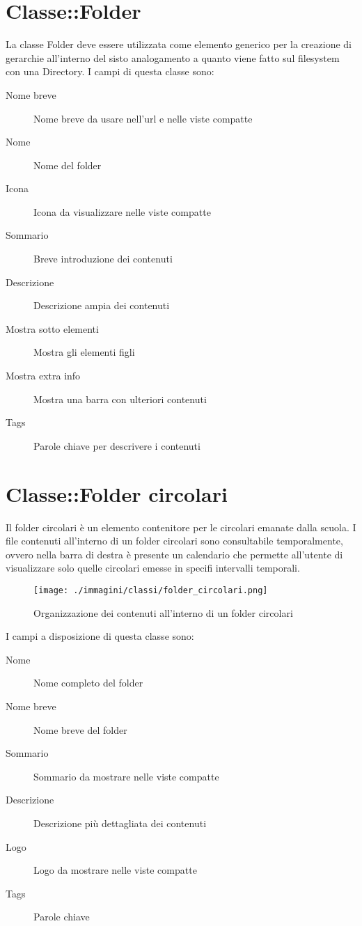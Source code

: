 \section{Classe::Folder}
La classe Folder deve essere utilizzata come elemento generico per la creazione di gerarchie all'interno del sisto analogamento a quanto viene fatto sul filesystem con una Directory. I campi di questa classe sono:
\begin{description}
 \item[Nome breve] Nome breve da usare nell'url e nelle viste compatte
\item[Nome]Nome del folder
\item[Icona] Icona da visualizzare nelle viste compatte
\item[Sommario]Breve introduzione dei contenuti
\item[Descrizione]Descrizione ampia dei contenuti
\item[Mostra sotto elementi]Mostra gli elementi figli
\item[Mostra extra info]Mostra una barra con ulteriori contenuti
\item[Tags]Parole chiave per descrivere i contenuti
\end{description}


\section{Classe::Folder circolari}
Il folder circolari è un elemento contenitore per le circolari emanate dalla scuola. I file contenuti all'interno di un folder circolari sono consultabile temporalmente, ovvero nella barra di destra è presente un calendario che permette all'utente di visualizzare solo quelle circolari emesse in specifi intervalli temporali.
\begin{figure}[H]
 \centering
 \texttt{[image: ./immagini/classi/folder\_circolari.png]}
 \caption{Organizzazione dei contenuti all'interno di un folder circolari}
 \label{fig:folder_circolari}
\end{figure}

I campi a disposizione di questa classe sono:
\begin{description}
 \item[Nome] Nome completo del folder
\item[Nome breve] Nome breve del folder
\item[Sommario] Sommario da mostrare nelle viste compatte
\item[Descrizione] Descrizione più dettagliata dei contenuti
\item[Logo]Logo da mostrare nelle viste compatte
\item[Tags]Parole chiave
\end{description}

